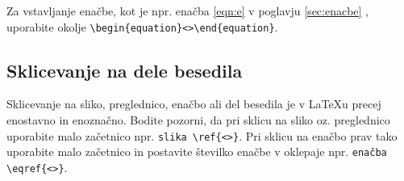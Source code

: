 Za vstavljanje enačbe, kot je npr. enačba \eqref{eqn:e} v poglavju \ref{sec:enacbe} , uporabite okolje \verb|\begin{equation}<>\end{equation}|.

\subsection{Sklicevanje na dele besedila}\label{sec:sklici}

Sklicevanje na sliko, preglednico, enačbo ali del besedila je v \LaTeX u precej enostavno in enoznačno. Bodite pozorni, da pri sklicu na sliko oz. preglednico uporabite malo začetnico npr. \verb|slika \ref{<>}|. Pri sklicu na enačbo prav tako uporabite malo začetnico in postavite številko enačbe v oklepaje npr. \verb|enačba \eqref{<>}|.




